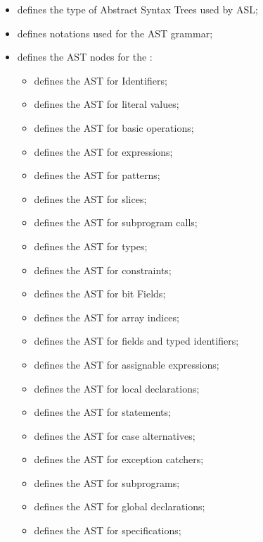 \ChapterOutline
\begin{itemize}
  \item {} defines the type of Abstract Syntax Trees used by ASL;
  \item {} defines notations used for the AST grammar;
  \item {} defines the AST nodes for the \untypedast:
  \begin{itemize}
    \item {} defines the AST for Identifiers;
    \item {} defines the AST for literal values;
    \item {} defines the AST for basic operations;
    \item {} defines the AST for expressions;
    \item {} defines the AST for patterns;
    \item {} defines the AST for slices;
    \item {} defines the AST for subprogram calls;
    \item {} defines the AST for types;
    \item {} defines the AST for constraints;
    \item {} defines the AST for bit Fields;
    \item {} defines the AST for array indices;
    \item {} defines the AST for fields and typed identifiers;
    \item {} defines the AST for assignable expressions;
    \item {} defines the AST for local declarations;
    \item {} defines the AST for statements;
    \item {} defines the AST for case alternatives;
    \item {} defines the AST for exception catchers;
    \item {} defines the AST for subprograms;
    \item {} defines the AST for global declarations;
    \item {} defines the AST for specifications;

\end{itemize}
\end{itemize}
